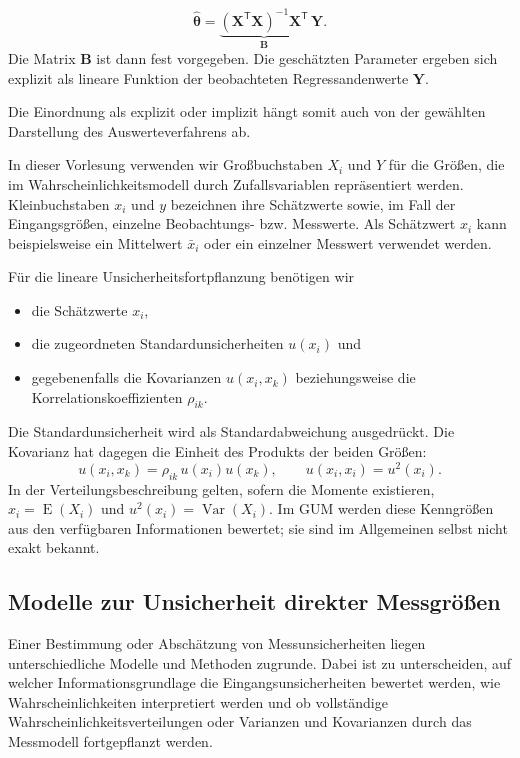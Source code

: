 \begin{equation}
\hat{\boldsymbol{\theta}}
=
\underbrace{(\mathbf X^\mathsf T\mathbf X)^{-1}\mathbf X^\mathsf T}_{\mathbf B}
\,\mathbf Y.
\end{equation}
Die Matrix $\mathbf B$ ist dann fest vorgegeben. Die geschätzten Parameter ergeben sich explizit als lineare Funktion der beobachteten Regressandenwerte $\mathbf Y$.

Die Einordnung als explizit oder implizit hängt somit auch von der gewählten
Darstellung des Auswerteverfahrens ab.

In dieser Vorlesung verwenden wir
Großbuchstaben $X_i$ und $Y$ für die Größen, die im
Wahrscheinlichkeitsmodell durch Zufallsvariablen repräsentiert werden.
Kleinbuchstaben $x_i$ und $y$ bezeichnen ihre Schätzwerte sowie,
im Fall der Eingangsgrößen, einzelne Beobachtungs- bzw. Messwerte.
Als Schätzwert $x_i$ kann beispielsweise ein Mittelwert $\bar x_i$
oder ein einzelner Messwert verwendet werden.

Für die lineare Unsicherheitsfortpflanzung benötigen wir
\begin{itemize}
\item die Schätzwerte $x_i$,
\item die zugeordneten Standardunsicherheiten $u(x_i)$ und
\item gegebenenfalls die Kovarianzen $u(x_i,x_k)$ beziehungsweise die
Korrelationskoeffizienten $\rho_{ik}$.
\end{itemize}
Die Standardunsicherheit wird als Standardabweichung ausgedrückt. Die
Kovarianz hat dagegen die Einheit des Produkts der beiden Größen:
\begin{equation}
u(x_i,x_k)=\rho_{ik}\,u(x_i)u(x_k),\qquad
u(x_i,x_i)=u^2(x_i).
\end{equation}
In der Verteilungsbeschreibung gelten, sofern die Momente existieren,
$x_i=\operatorname E(X_i)$ und $u^2(x_i)=\operatorname{Var}(X_i)$.
Im GUM werden diese Kenngrößen aus den verfügbaren Informationen bewertet;
sie sind im Allgemeinen selbst nicht exakt bekannt.

\subsection{Modelle zur Unsicherheit direkter Messgrößen}

Einer Bestimmung oder Abschätzung von Messunsicherheiten liegen unterschiedliche Modelle und Methoden zugrunde. Dabei ist zu unterscheiden, auf welcher Informationsgrundlage die Eingangsunsicherheiten bewertet werden, wie Wahrscheinlichkeiten interpretiert werden und ob vollständige Wahrscheinlichkeitsverteilungen oder Varianzen und Kovarianzen durch das Messmodell fortgepflanzt werden.

